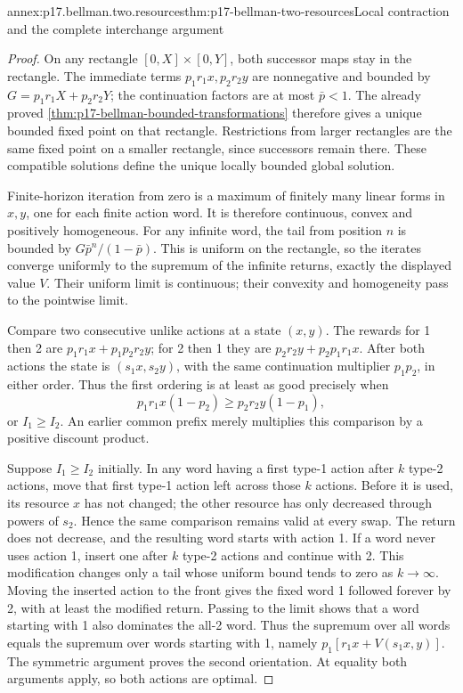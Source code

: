\begin{annexitem}{annex:p17.bellman.two.resources}{thm:p17-bellman-two-resources}{Local contraction and the complete interchange argument}
\begin{proof}
On any rectangle \([0,X]\times[0,Y]\),
both successor maps stay in the
rectangle. The immediate terms
\(p_1r_1x,p_2r_2y\) are nonnegative
and bounded by
\(G=p_1r_1X+p_2r_2Y\);
the continuation factors are at
most \(\bar p<1\).
The already proved
\cref{thm:p17-bellman-bounded-transformations}
therefore gives a unique bounded
fixed point on that rectangle.
Restrictions from larger rectangles
are the same fixed point on a
smaller rectangle, since successors
remain there. These compatible
solutions define the unique
locally bounded global solution.

Finite-horizon iteration from zero
is a maximum of finitely many
linear forms in \(x,y\), one for
each finite action word. It is
therefore continuous, convex and
positively homogeneous.
For any infinite word, the tail
from position \(n\) is bounded by
\(G\bar p^n/(1-\bar p)\).
This is uniform on the rectangle,
so the iterates converge uniformly
to the supremum of the infinite
returns, exactly the displayed
value \(V\). Their uniform limit
is continuous; their convexity
and homogeneity pass to the
pointwise limit.

Compare two consecutive unlike
actions at a state \((x,y)\).
The rewards for 1 then 2 are
\(p_1r_1x+p_1p_2r_2y\);
for 2 then 1 they are
\(p_2r_2y+p_2p_1r_1x\).
After both actions the state
is \((s_1x,s_2y)\), with the
same continuation multiplier
\(p_1p_2\), in either order.
Thus the first ordering is
at least as good precisely when
\[
      p_1r_1x(1-p_2)\geq p_2r_2y(1-p_1),
\]
or \(I_1\geq I_2\).
An earlier common prefix merely
multiplies this comparison by
a positive discount product.

Suppose \(I_1\geq I_2\) initially.
In any word having a first
type-1 action after \(k\) type-2
actions, move that first type-1
action left across those \(k\)
actions. Before it is used,
its resource \(x\) has not
changed; the other resource
has only decreased through
powers of \(s_2\).
Hence the same comparison
remains valid at every swap.
The return does not decrease,
and the resulting word starts
with action 1.
If a word never uses action 1,
insert one after \(k\) type-2
actions and continue with 2.
This modification changes only
a tail whose uniform bound
tends to zero as \(k\to\infty\).
Moving the inserted action to
the front gives the fixed word
1 followed forever by 2, with
at least the modified return.
Passing to the limit shows that
a word starting with 1 also
dominates the all-2 word.
Thus the supremum over all
words equals the supremum over
words starting with 1, namely
\(p_1[r_1x+V(s_1x,y)]\).
The symmetric argument proves
the second orientation. At
equality both arguments apply,
so both actions are optimal.


\end{proof}
\end{annexitem}
